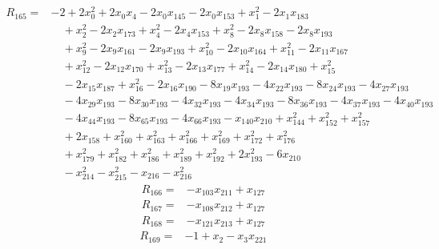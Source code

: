 \begin{equation*}\begin{split}
R_{165}={}&-2 + 2x_{0}^{2} + 2x_{0} x_{4} - 2x_{0} x_{145} - 2x_{0} x_{153} + x_{1}^{2} - 2x_{1} x_{183}\\
&\quad + x_{2}^{2} - 2x_{2} x_{173} + x_{4}^{2} - 2x_{4} x_{153} + x_{8}^{2} - 2x_{8} x_{158} - 2x_{8} x_{193}\\
&\quad + x_{9}^{2} - 2x_{9} x_{161} - 2x_{9} x_{193} + x_{10}^{2} - 2x_{10} x_{164} + x_{11}^{2} - 2x_{11} x_{167}\\
&\quad + x_{12}^{2} - 2x_{12} x_{170} + x_{13}^{2} - 2x_{13} x_{177} + x_{14}^{2} - 2x_{14} x_{180} + x_{15}^{2}\\
&\quad -2x_{15} x_{187} + x_{16}^{2} - 2x_{16} x_{190} - 8x_{19} x_{193} - 4x_{22} x_{193} - 8x_{24} x_{193} - 4x_{27} x_{193}\\
&\quad -4x_{29} x_{193} - 8x_{30} x_{193} - 4x_{32} x_{193} - 4x_{34} x_{193} - 8x_{36} x_{193} - 4x_{37} x_{193} - 4x_{40} x_{193}\\
&\quad -4x_{44} x_{193} - 8x_{65} x_{193} - 4x_{66} x_{193} - x_{140} x_{210} + x_{144}^{2} + x_{152}^{2} + x_{157}^{2}\\
&\quad + 2x_{158} + x_{160}^{2} + x_{163}^{2} + x_{166}^{2} + x_{169}^{2} + x_{172}^{2} + x_{176}^{2}\\
&\quad + x_{179}^{2} + x_{182}^{2} + x_{186}^{2} + x_{189}^{2} + x_{192}^{2} + 2x_{193}^{2} - 6x_{210}\\
&\quad -x_{214}^{2} - x_{215}^{2} - x_{216} - x_{216}^{2}
\end{split}\end{equation*}
\begin{equation*}\begin{split}
R_{166}={}&-x_{103} x_{211} + x_{127}
\end{split}\end{equation*}
\begin{equation*}\begin{split}
R_{167}={}&-x_{108} x_{212} + x_{127}
\end{split}\end{equation*}
\begin{equation*}\begin{split}
R_{168}={}&-x_{121} x_{213} + x_{127}
\end{split}\end{equation*}
\begin{equation*}\begin{split}
R_{169}={}&-1 + x_{2} - x_{3} x_{221}
\end{split}\end{equation*}
